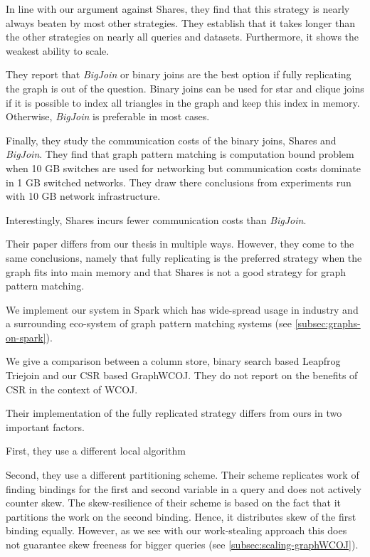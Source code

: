 In line with our argument against Shares, they find that this strategy is nearly always
beaten by most other strategies.
They establish that it takes longer than the other strategies on nearly all queries and datasets.
Furthermore, it shows the weakest ability to scale.

They report that \textit{BigJoin} or binary joins are the best option if fully
replicating the graph is out of the question.
Binary joins can be used for star and clique joins if it is possible to index all triangles in
the graph and keep this index in memory.
Otherwise, \textit{BigJoin} is preferable in most cases.

Finally, they study the communication costs of the binary joins, Shares and \textit{BigJoin}.
They find that graph pattern matching is computation bound problem when 10 GB switches are used
for networking but communication costs dominate in 1 GB switched networks.
They draw there conclusions from experiments run with 10 GB network infrastructure.

Interestingly, Shares incurs fewer communication costs than \textit{BigJoin}.

Their paper differs from our thesis in multiple ways.
However, they come to the same conclusions, namely that fully replicating is the preferred strategy
when the graph fits into main memory and that Shares is not a good strategy for graph pattern matching.

We implement our system in Spark which has wide-spread usage in industry and a surrounding eco-system
of graph pattern matching systems (see \cref{subsec:graphs-on-spark}).

We give a comparison between a column store, binary search based Leapfrog Triejoin and
our \textsc{CSR} based GraphWCOJ.
They do not report on the benefits of \textsc{CSR} in the context of \textsc{WCOJ}.

Their implementation of the fully replicated strategy differs from ours in two important factors.

First, they use a different local algorithm %

Second, they use a different partitioning scheme.
Their scheme replicates work of finding bindings for the first and second variable in a query and does not actively counter skew.
The skew-resilience of their scheme is based on the fact that it partitions the work on the second
binding.
Hence, it distributes skew of the first binding equally.
However, as we see with our work-stealing approach this does not guarantee skew freeness for
bigger queries (see \cref{subsec:scaling-graphWCOJ}).


